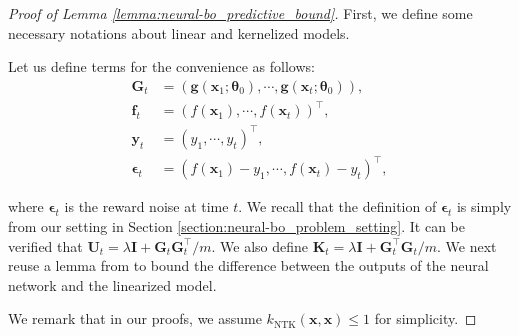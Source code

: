 \begin{proof}[Proof of Lemma \ref{lemma:neural-bo_predictive_bound}]

First, we define some necessary notations about linear and kernelized models.  
\begin{subdefinition}
\label{def:neural-bo_linear_kernelized_terms}
Let us define terms for the convenience as follows:
\begin{align*}
\mathbf{G}_t & = (\mathbf{g}(\mathbf{x}_1; \boldsymbol{\theta}_0),\cdots,\mathbf{g}(\mathbf{x}_t; \boldsymbol{\theta}_0)),
\\
     \mathbf{f}_t & = (f(\mathbf{x}_1), \cdots, f(\mathbf{x}_t))^\top,  
\\
     \mathbf{y}_t & = (y_1, \cdots, y_t)^\top, 
\\
     \boldsymbol{\epsilon}_t & = (f(\mathbf{x}_1) - y_1, \cdots, f(\mathbf{x}_t) - y_t)^\top,
\end{align*}
\end{subdefinition}
\noindent where $\boldsymbol{\epsilon}_t$ is the reward noise at time $t$. We recall that the definition of $\boldsymbol{\epsilon}_t$ is simply from our setting in Section \ref{section:neural-bo_problem_setting}. It can be verified that $\mathbf{U}_t = \lambda\mathbf{I} + \mathbf{G}_t\mathbf{G}_t^\top/m$. 
We also define $\mathbf{K}_t = \lambda\mathbf{I} + \mathbf{G}_t ^\top\mathbf{G}_t /m$. 
We next reuse a lemma from \citet{zhang2021neural} to bound the difference between the outputs of the neural network and the linearized model.


\noindent We remark that in our proofs, we assume $k_{\text{NTK}}(\mathbf{x}, \mathbf{x}) \leq 1$ for simplicity. 


\end{proof}
